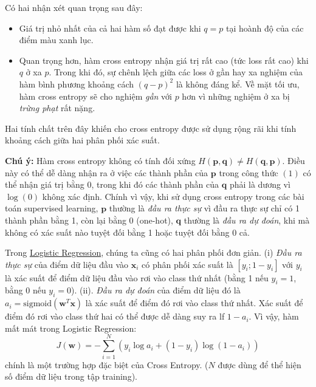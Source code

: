 Có hai nhận xét quan trọng sau đây: 

\begin{itemize}
    \item Giá trị nhỏ nhất của cả hai hàm số đạt được khi $q = p$ tại hoành độ của các điểm màu xanh lục. 
     
    \item Quan trọng hơn, hàm cross entropy nhận giá trị rất cao (tức loss rất cao) khi $q$ ở xa $p$. Trong khi đó, sự chênh lệch giữa các loss ở gần hay xa nghiệm của hàm bình phương khoảng cách $(q - p)^2$ là không đáng kể. Về mặt tối ưu, hàm cross entropy sẽ cho nghiệm \textit{gần} với $p$ hơn vì những nghiệm ở xa bị \textit{trừng phạt} rất nặng.  
\end{itemize}

Hai tính chất trên đây khiến cho cross entropy được sử dụng rộng rãi khi tính khoảng cách giữa hai phân phối xác suất. 
 
\textbf{Chú ý:} Hàm cross entropy không có tính đối xứng $H(\mathbf{p}, \mathbf{q}) \neq H(\mathbf{q}, \mathbf{p})$. Điều này có thể dễ dàng nhận ra ở việc các thành phần của $\mathbf{p}$ trong công thức $(1)$ có thể nhận giá trị bằng 0, trong khi đó các thành phần của $\mathbf{q}$ phải là dương vì $\log(0)$ không xác định. Chính vì vậy, khi sử dụng cross entropy trong các bài toán supervised learning, $\mathbf{p}$ thường là \textit{đầu ra thực sự} vì đầu ra thực sự chỉ có 1 thành phần bằng 1, còn lại bằng 0 (one-hot), $\mathbf{q}$ thường là \textit{đầu ra dự đoán}, khi mà không có xác suất nào tuyệt đối bằng 1 hoặc tuyệt đối bằng 0 cả.  
 
 
Trong \href{http://127.0.0.1:4000/2017/01/27/logisticregression/}{Logistic Regression}, chúng ta cũng có hai phân phối đơn giản. (i) \textit{Đầu ra thực sự} của điểm dữ liệu đầu vào $\mathbf{x}_i$ có phân phối xác suất là $[y_i; 1 - y_i]$ với $y_i$ là xác suất để điểm dữ liệu đầu vào rơi vào class thứ nhất (bằng 1 nếu $y_i = 1$, bằng 0 nếu $y_i = 0$). (ii). \textit{Đầu ra dự đoán} của điểm dữ liệu đó là $a_i = \text{sigmoid}(\mathbf{w}^T\mathbf{x})$ là xác suất để điểm đó rơi vào class thứ nhất. Xác suất để điểm đó rơi vào class thứ hai có thể được dễ dàng suy ra lf $1 - a_i$. Vì vậy, hàm mất mát trong Logistic Regression: 
\begin{equation*} 
J(\mathbf{w}) = -\sum_{i=1}^N(y_i \log {a}_i + (1-y_i) \log (1 - {a}_i)) 
\end{equation*} 
chính là một trường hợp đặc biệt của Cross Entropy. ($N$ được dùng để thể hiện số điểm dữ liệu trong tập training). 
 
